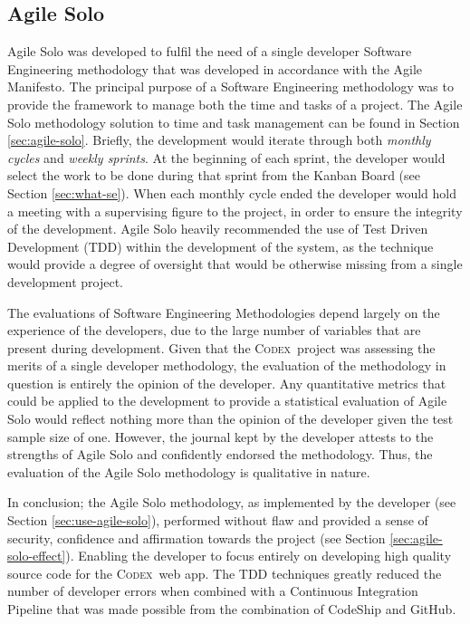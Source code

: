 \documentclass[final]{cmpreport}
\newcommand{\Codex}{\textsc{Codex}}
\begin{document}
		\subsection{Agile Solo} \label{sec:agile-solo-conc}
		Agile Solo was developed to fulfil the need of a single developer Software Engineering methodology that was developed in accordance with the Agile Manifesto. The principal purpose of a Software Engineering methodology was to provide the framework to manage both the time and tasks of a project. The Agile Solo methodology solution to time and task management can be found in Section \ref{sec:agile-solo}. Briefly, the development would iterate through both \textit{monthly cycles} and \textit{weekly sprints}. At the beginning of each sprint, the developer would select the work to be done during that sprint from the Kanban Board (see Section \ref{sec:what-se}). When each monthly cycle ended the developer would hold a meeting with a supervising figure to the project, in order to ensure the integrity of the development. Agile Solo heavily recommended the use of Test Driven Development (TDD) within the development of the system, as the technique would provide a degree of oversight that would be otherwise missing from a single development project.
		
		The evaluations of Software Engineering Methodologies depend largely on the experience of the developers, due to the large number of variables that are present during development. Given that the \Codex \ project was assessing the merits of a single developer methodology, the evaluation of the methodology in question is entirely the opinion of the developer. Any quantitative metrics that could be applied to the development to provide a statistical evaluation of Agile Solo would reflect nothing more than the opinion of the developer given the test sample size of one. However, the journal kept by the developer attests to the strengths of Agile Solo and confidently endorsed the methodology. Thus, the evaluation of the Agile Solo methodology is qualitative in nature.
		
		In conclusion; the Agile Solo methodology, as implemented by the developer (see Section \ref{sec:use-agile-solo}), performed without flaw and provided a sense of security, confidence and affirmation towards the project (see Section \ref{sec:agile-solo-effect}). Enabling the developer to focus entirely on developing high quality source code for the \Codex \ web app. The TDD techniques greatly reduced the number of developer errors when combined with a Continuous Integration Pipeline that was made possible from the combination of CodeShip and GitHub. 
		
\end{document}
